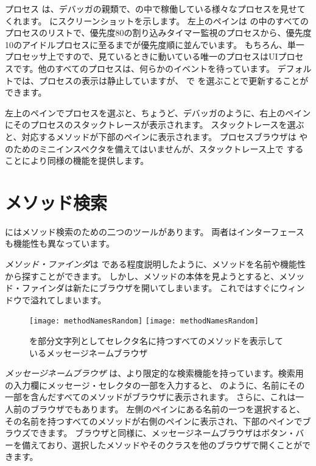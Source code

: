 \documentclass[a4paper,10pt,twoside]{book}
\begin{document}
プロセス  は、デバッガの親類で、\pharo の中で稼働している様々なプロセスを見せてくれます。
 にスクリーンショットを示します。
左上のペインは \pharo の中のすべてのプロセスのリストで、優先度80の割り込みタイマー監視のプロセスから、優先度10のアイドルプロセスに至るまでが優先度順に並んでいます。
もちろん、単一プロセッサ上ですので、見ているときに動いている唯一のプロセスはUIプロセスです。他のすべてのプロセスは、何らかのイベントを待っています。
デフォルトでは、プロセスの表示は静止していますが、 で  を選ぶことで更新することができます。

左上のペインでプロセスを選ぶと、ちょうど、デバッガのように、右上のペインにそのプロセスのスタックトレースが表示されます。
スタックトレースを選ぶと、対応するメソッドが下部のペインに表示されます。
プロセスブラウザは \self や  のためのミニインスペクタを備えてはいませんが、スタックトレース上で  することにより同様の機能を提供します。

\section{メソッド検索}

\pharo にはメソッド検索のための二つのツールがあります。
両者はインターフェースも機能性も異なっています。

\emph{メソッド・ファインダ}は  である程度説明したように、メソッドを名前や機能性から探すことができます。
しかし、メソッドの本体を見ようとすると、メソッド・ファインダは新たにブラウザを開いてしまいます。
これではすぐにウィンドウで溢れてしまいます。

\begin{figure}[btp]
\begin{center}
\ifluluelse
{\texttt{[image: methodNamesRandom]}}
{\texttt{[image: methodNamesRandom]}}
\end{center}
\caption{ を部分文字列としてセレクタ名に持つすべてのメソッドを表示しているメッセージネームブラウザ}
\end{figure}

\emph{メッセージネームブラウザ} は、より限定的な検索機能を持っています。検索用の入力欄にメッセージ・セレクタの一部を入力すると、 のように、名前にその一部を含んだすべてのメソッドがブラウザに表示されます。
さらに、これは一人前のブラウザでもあります。
左側のペインにある名前の一つを選択すると、その名前を持つすべてのメソッドが右側のペインに表示され、下部のペインでブラウズできます。
ブラウザと同様に、メッセージネームブラウザはボタン・バーを備えており、選択したメソッドやそのクラスを他のブラウザで開くことができます。
\end{document}
